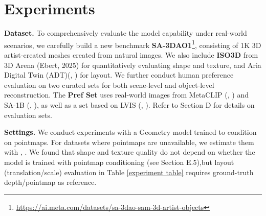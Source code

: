 \documentclass[manuscript,review]{acmart}
\begin{document}
\section{Experiments}


\textbf{Dataset.} To comprehensively evaluate the model capability under real-world scenarios, we carefully build a new benchmark \textbf{SA-3DAO1}\footnote{\url{https://ai.meta.com/datasets/sa-3dao-sam-3d-artist-objects}}, consisting of 1K 3D artist-created meshes created from natural images. We also include \textbf{ISO3D} from 3D Arena (Ebert, 2025) for quantitatively evaluating shape and texture, and Aria Digital Twin (ADT)(\citet{pan2023aria}, \citeyear{pan2023aria}) for layout. We further conduct human preference evaluation on two curated sets for both scene-level and object-level reconstruction. The \textbf{Pref Set} uses real-world images from MetaCLIP (\citet{xu2024amodal}, \citeyear{xu2024amodal}) and SA-1B (\citet{kirillov2023segment}, \citeyear{kirillov2023segment}), as well as a set based on LVIS (\citet{gupta2019lvis}, \citeyear{gupta2019lvis}). Refer to Section D for details on evaluation sets.

\vspace{1\baselineskip}

\textbf{Settings.} We conduct experiments with a Geometry model trained to condition on pointmaps. For datasets where pointmaps are unavailable, we estimate them with \citet{wang2025octothinkermidtrainingincentivizesreinforcement}, \citeyear{wang2025octothinkermidtrainingincentivizesreinforcement}. We found that shape and texture quality do not depend on whether the model is trained with pointmap conditioning (see Section E.5),but layout (translation/scale) evaluation in Table \ref{experiment table} requires ground-truth depth/pointmap as reference.
\end{document}
